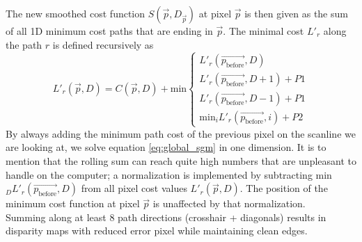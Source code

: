 \documentclass  [
  paper    = a4,
  BCOR     = 10mm,
  twoside,
  fontsize = 12pt,
  fleqn,
  toc      = bibnumbered,
  toc      = listofnumbered,
  numbers  = noendperiod,
  headings = normal,
  listof   = leveldown,
  version  = 3.03
]                                       {scrreprt}
\begin{document}
The new smoothed cost function $S(\vec p , D_{\vec p})$ at pixel $\vec{p}$ is then given as the sum of all 1D minimum cost paths that are ending in $\vec{p}$.  The minimal cost $L'_r$ along the path $r$ is defined recursively as
\begin{equation}\label{eq:local_sgm}
L'_r(\vec{p}, D) = C(\vec{p}, D) + \text {min}
\begin{cases}
	L'_r(\vec{p_\text{before}}, D) \\
	L'_r(\vec{p_\text{before}}, D+1)+P1 \\
	L'_r(\vec{p_\text{before}}, D-1)+P1 \\
	\text{min}_i L'_r(\vec{p_\text{before}}, i)+P2 
\end{cases}
\end{equation} 
By always adding the minimum path cost of the previous pixel on the scanline we are looking at, we solve equation \ref{eq:global_sgm} in one dimension. It is to mention that the rolling sum can reach quite high numbers that are unpleasant to handle on the computer; a normalization is implemented by subtracting min$_D L'_r(\vec{p_\text{before}}, D)$ from all pixel cost values $L'_r(\vec{p}, D)$. The position of the minimum cost function at pixel $\vec p$ is unaffected by that normalization.\\
 Summing along at least 8 path directions (crosshair + diagonals) results in disparity maps with reduced error pixel while maintaining clean edges. 
\end{document}
